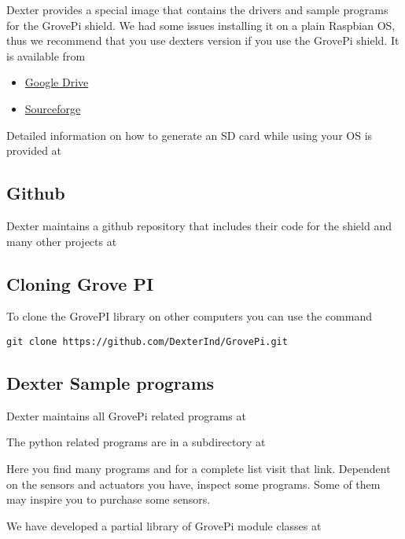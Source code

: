 Dexter provides a special image that contains the drivers and sample
programs for the GrovePi shield. We had some issues installing it on a
plain Raspbian OS, thus we recommend that you use dexters version if you
use the GrovePi shield. It is available from

\begin{itemize}
\item
  \href{http://sourceforge.net/projects/dexterindustriesraspbianflavor/}{Google Drive}
\item
  \href{http://sourceforge.net/projects/dexterindustriesraspbianflavor/}{Sourceforge}
\end{itemize}

Detailed information on how to generate an SD card while using your OS
is provided at


\subsection{Github}\label{github}

Dexter maintains a github repository that includes their code for the
shield and many other projects at


\subsection{Cloning Grove PI}\label{cloning-grove-pi}

To clone the GrovePI library on other computers you can use the command

\begin{verbatim}
git clone https://github.com/DexterInd/GrovePi.git
\end{verbatim}

\subsection{Dexter Sample programs}\label{dexter-sample-programs}

Dexter maintains all GrovePi related programs at


The python related programs are in a subdirectory at


Here you find many programs and for a complete list visit that link.
Dependent on the sensors and actuators you have, inspect some programs.
Some of them may inspire you to purchase some sensors.

We have developed a partial library of GrovePi module classes at


